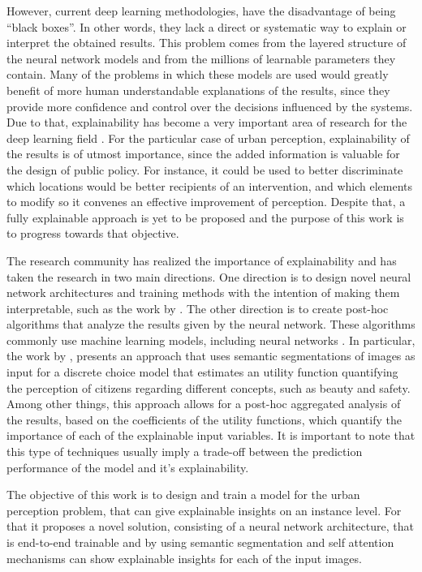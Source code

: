However, current deep learning methodologies, have the disadvantage of being ``black boxes''. In other
words, they lack a direct or systematic way to explain or interpret the obtained results. This problem
comes from the layered structure of the neural network models and from the millions of learnable parameters
they contain. Many of the problems in which these models are used would greatly benefit of more
human understandable explanations of the results, since they provide more confidence and control
over the decisions influenced by the systems. Due to that, explainability has become a very important area of
research for the deep learning field \cite{adadi_xai, ras_explanation}. For the particular case of urban perception,
explainability of the results is of utmost importance, since the added information is valuable
for the design of public policy. For instance, it could be used to better discriminate which locations
would be better recipients of an intervention, and which elements to modify so it convenes
an effective improvement of perception. Despite that, a fully explainable approach is yet to be
proposed and the purpose of this work is to progress towards that objective.

The research community has realized the importance of explainability
and has taken the research in two main directions. One direction is to design novel
neural network architectures and training methods with the intention of making them interpretable,
such as the work by . The other
direction is to  create post-hoc algorithms \cite{adadi_xai} that analyze the results given by the
neural network. These algorithms commonly use machine learning models, including neural networks \cite{kim_ace}.
In particular, the work by , presents an approach that uses semantic segmentations of  images
\cite{segnet} as input for a discrete choice model that estimates an utility function quantifying the
perception of citizens regarding different concepts, such as beauty and safety.
Among other things, this approach allows for a post-hoc aggregated analysis of the results, based
on the coefficients of the utility functions, which quantify the importance of each of the explainable input variables.
It is important to note that this type of techniques usually imply
a trade-off between the prediction performance of the model
and it's explainability.

The objective of this work is to design and train a model for the urban perception problem,
that can give explainable insights on an instance level. For that it proposes a novel solution,
consisting of a neural network architecture, that is end-to-end trainable and by using semantic
segmentation \cite{pspnet} and self attention mechanisms \cite{vaswani_attention} can show
explainable insights for each of the input images.

